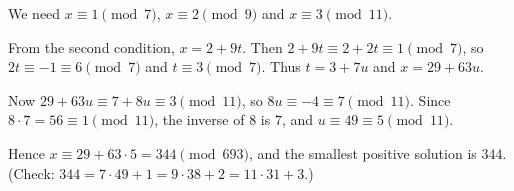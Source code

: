 We need $x\equiv1\pmod7$, $x\equiv2\pmod9$ and $x\equiv3\pmod{11}$.

From the second condition, $x=2+9t$. Then $2+9t\equiv2+2t\equiv1\pmod7$, so $2t\equiv-1\equiv6\pmod7$ and $t\equiv3\pmod7$. Thus $t=3+7u$ and $x=29+63u$.

Now $29+63u\equiv7+8u\equiv3\pmod{11}$, so $8u\equiv-4\equiv7\pmod{11}$. Since $8\cdot7=56\equiv1\pmod{11}$, the inverse of $8$ is $7$, and $u\equiv49\equiv5\pmod{11}$.

Hence $x\equiv29+63\cdot5=344\pmod{693}$, and the smallest positive solution is $\boxed{344}$. (Check: $344=7\cdot49+1=9\cdot38+2=11\cdot31+3$.)
